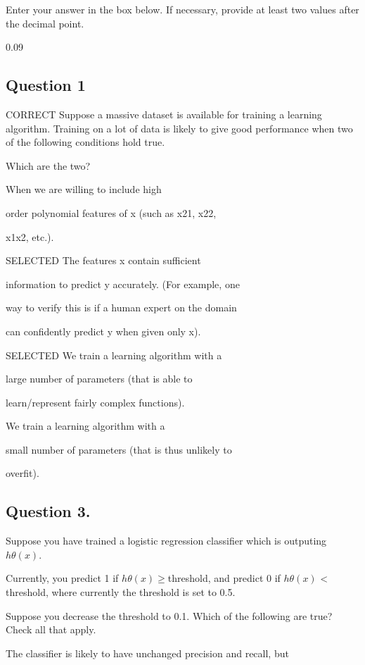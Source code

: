 \documentclass[11pt]{article} %
\begin{document}
Enter your answer in the box below. If necessary, provide at least two values after the decimal point.

0.09
\subsection{Question 1} 
CORRECT
Suppose a massive dataset is available for training a learning algorithm. Training on a lot of data is likely to give good performance when two of the following conditions hold true.

Which are the two?


When we are willing to include high

order polynomial features of x (such as x21, x22,

x1x2, etc.).

SELECTED The features x contain sufficient

information to predict y accurately. (For example, one

way to verify this is if a human expert on the domain

can confidently predict y when given only x).


SELECTED  We train a learning algorithm with a

large number of parameters (that is able to

learn/represent fairly complex functions).



We train a learning algorithm with a

small number of parameters (that is thus unlikely to

overfit).

\subsection{Question 3.}


Suppose you have trained a logistic regression classifier which is outputing $h\theta(x)$.


Currently, you predict 1 if $h\theta(x) \geq $threshold, and predict 
0 if $h\theta(x)$ < threshold, where currently the threshold is set to 0.5.

Suppose you decrease the threshold to 0.1. Which of the following are true? Check all that apply.

The classifier is likely to have unchanged precision and recall, but
\end{document}
